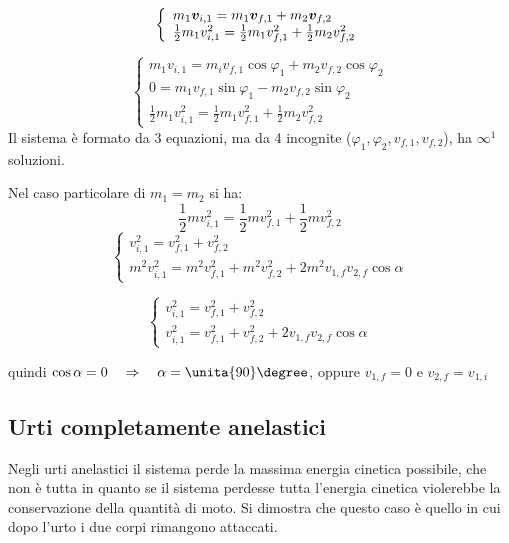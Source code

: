 \[\left\{
\begin{array}{l}
m_1\boldsymbol{v}_{i,1}=m_1\boldsymbol{v}_{f,1}+m_2\boldsymbol{v}_{f,2}\\
\frac{1}{2}m_1 v_{i,1}^2=\frac{1}{2}m_1 v_{f,1}^2+\frac{1}{2}m_2
v_{f,2}^2
\end{array}\right.\]

\[\left\{
\begin{array}{l}
m_1v_{i,1}=m_iv_{f,1}\cos\varphi_1+m_2v_{f,2}\cos\varphi_2\\
0=m_1v_{f,1}\sin\varphi_1-m_2v_{f,2}\sin\varphi_2\\
\frac{1}{2}m_1 v_{i,1}^2=\frac{1}{2}m_1 v_{f,1}^2+\frac{1}{2}m_2
v_{f,2}^2
\end{array}\right.\]
Il sistema è formato da 3 equazioni, ma da 4 incognite
($\varphi_1, \varphi_2, v_{f,1}, v_{f,2}$), ha $\infty^1$
soluzioni.

Nel caso particolare di $m_1=m_2$ si ha:
\[\frac{1}{2}m v_{i,1}^2=\frac{1}{2}m
v_{f,1}^2+\frac{1}{2}m v_{f,2}^2\]
\[\left\{
\begin{array}{l}
v_{i,1}^2=v_{f,1}^2+v_{f,2}^2\\
m^2v_{i,1}^2=m^2v_{f,1}^2+m^2v_{f,2}^2+2m^2v_{1,f}v_{2,f}\cos\alpha
\end{array}
\right.\]

\[\left\{
\begin{array}{l}
v_{i,1}^2=v_{f,1}^2+v_{f,2}^2\\
v_{i,1}^2=v_{f,1}^2+v_{f,2}^2+2v_{1,f}v_{2,f}\cos\alpha
\end{array}
\right.\]

quindi $\cos \alpha=0\quad\Rightarrow\quad\alpha=\unita{90}\degree$, oppure $v_{1,f}=0$ e $v_{2,f}=v_{1,i}$

\subsection{Urti completamente anelastici}

Negli urti anelastici il sistema perde la massima energia cinetica possibile, che non è tutta
in quanto se il sistema perdesse tutta l'energia cinetica violerebbe la conservazione
della quantità di moto. Si dimostra che questo caso è quello in cui dopo l'urto i due corpi
rimangono attaccati.

